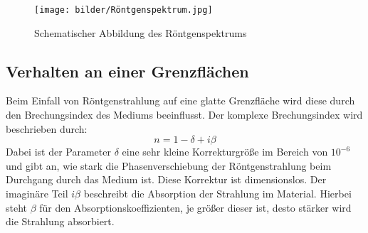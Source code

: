 \begin{figure}
    \texttt{[image: bilder/Röntgenspektrum.jpg]}
    \caption{Schematischer Abbildung des Röntgenspektrums}
    \label{fig:Abbildung 1}
\end{figure}

\subsection{Verhalten an einer Grenzflächen}
Beim Einfall von Röntgenstrahlung auf eine glatte Grenzfläche wird diese durch den Brechungsindex des Mediums beeinflusst.
Der komplexe Brechungsindex wird beschrieben durch:
\begin{equation}
    n=1-\delta+i\beta
\end{equation}
Dabei ist der Parameter \(\delta\) eine sehr kleine Korrekturgröße im Bereich von $10^{-6}$
und gibt an, wie stark die Phasenverschiebung der Röntgenstrahlung beim Durchgang durch das Medium ist.
Diese Korrektur ist dimensionslos. Der imaginäre Teil \(i\beta\) beschreibt die Absorption der Strahlung im Material.
Hierbei steht \(\beta\) für den Absorptionskoeffizienten, je größer dieser ist, desto stärker wird die Strahlung absorbiert.

